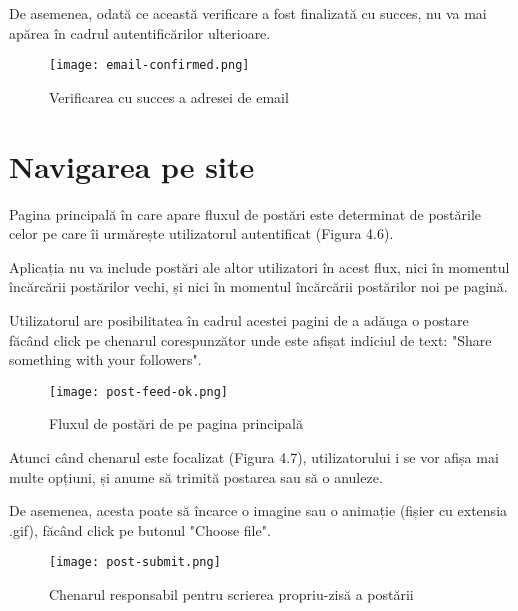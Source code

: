 De asemenea, odată ce această verificare a fost finalizată cu succes, nu va mai apărea în cadrul autentificărilor ulterioare.\newline
\bigskip

\begin{figure}[H]
	\begin{center}
		\texttt{[image: email-confirmed.png]}
		\caption{Verificarea cu succes a adresei de email}
	\end{center}
\end{figure}
\bigskip

\section{Navigarea pe site}

Pagina principală în care apare fluxul de postări este determinat de postările celor pe care îi urmărește utilizatorul autentificat (Figura 4.6).\newline
 
Aplicația nu va include postări ale altor utilizatori în acest flux, nici în momentul încărcării postărilor vechi, și nici în momentul încărcării postărilor noi pe pagină.\newline

Utilizatorul are posibilitatea în cadrul acestei pagini de a adăuga o postare făcând click pe chenarul corespunzător unde este afișat indiciul de text: "Share something with your followers".\newline
\bigskip

\begin{figure}[H]
	\begin{center}
		\texttt{[image: post-feed-ok.png]}
		\caption{Fluxul de postări de pe pagina principală}
	\end{center}
\end{figure}

Atunci când chenarul este focalizat (Figura 4.7), utilizatorului i se vor afișa mai multe opțiuni, și anume să trimită postarea sau să o anuleze.\newline

De asemenea, acesta poate să încarce o imagine sau o animație (fișier cu extensia .gif), făcând click pe butonul "Choose file".\newline
\bigskip

\begin{figure}[H]
	\begin{center}
		\texttt{[image: post-submit.png]}
		\caption{Chenarul responsabil pentru scrierea propriu-zisă a postării}
	\end{center}
\end{figure}

